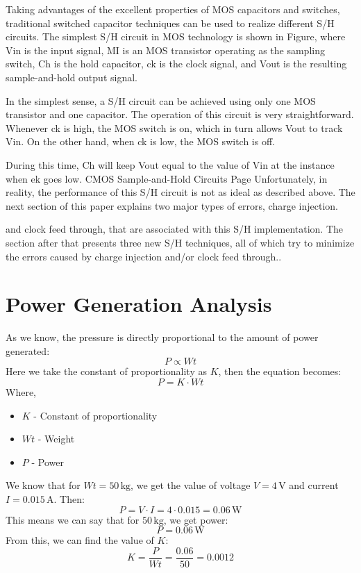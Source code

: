 \documentclass[12pt]{article}
\begin{document}
Taking advantages of the excellent properties of MOS capacitors and switches, traditional switched capacitor techniques can be used to realize different S/H circuits. The simplest S/H circuit in MOS technology is shown in Figure, where Vin is the input signal, MI is an MOS transistor operating as the sampling switch, Ch is the hold capacitor, ck is the clock signal, and Vout is the resulting sample-and-hold output signal.

In the simplest sense, a S/H circuit can be achieved using only one MOS transistor and one capacitor. The operation of this circuit is very straightforward. Whenever ck is high, the MOS switch is on, which in turn allows Vout to track Vin. On the other hand, when ck is low, the MOS switch is off.

During this time, Ch will keep Vout equal to the value of Vin at the instance when ek goes low. CMOS Sample-and-Hold Circuits Page Unfortunately, in reality, the performance of this S/H circuit is not as ideal as described above. The next section of this paper explains two major types of errors, charge injection.

and clock feed through, that are associated with this S/H implementation. The section after that presents three new S/H techniques, all of which try to minimize the errors caused by charge injection and/or clock feed through..

\newpage
\section*{Power Generation Analysis}

As we know, the pressure is directly proportional to the amount of power generated:
\[
P \propto Wt
\]
Here we take the constant of proportionality as \(K\), then the equation becomes:
$$ P = K \cdot Wt $$
Where,  
\begin{itemize}
    \item \(K\) - Constant of proportionality
    \item \(Wt\) - Weight
    \item \(P\) - Power
\end{itemize}

We know that for \(Wt = 50\, \text{kg}\), we get the value of voltage \(V = 4\, \text{V}\) and current \(I = 0.015\, \text{A}\).  
Then:
$$ P = V \cdot I = 4 \cdot 0.015 = 0.06\, \text{W} $$
This means we can say that for \(50\, \text{kg}\), we get power:
$$ P = 0.06\, \text{W} $$
From this, we can find the value of \(K\):
$$ K = \frac{P}{Wt} = \frac{0.06}{50} = 0.0012 $$
\end{document}
